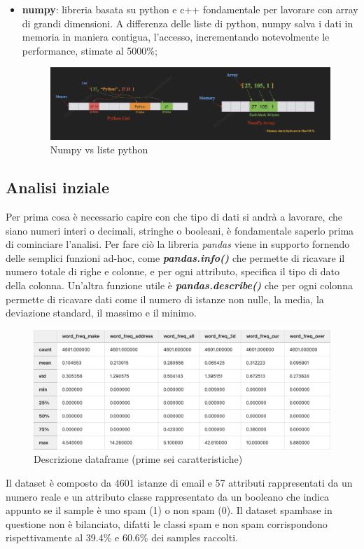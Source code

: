\documentclass[12pt,a4paper]{article}
\begin{document}
\begin{itemize}
    \item \textbf{numpy}: libreria basata su python e c++ fondamentale per lavorare con array di grandi dimensioni. A differenza delle liste di python, numpy salva i dati in memoria in maniera contigua, l'accesso, incrementando notevolmente le performance, stimate al 5000\%;
    \begin{figure}[h]
        \includegraphics[width=1\linewidth]{numpy_vs_list.png}
        \caption{Numpy vs liste python}
    \end{figure}

\end{itemize}

\clearpage
\subsection{Analisi inziale}
Per prima cosa è necessario capire con che tipo di dati si andrà a lavorare, che siano numeri interi o decimali, stringhe o booleani, è fondamentale saperlo prima di cominciare l'analisi.
Per fare ciò la libreria \textit{pandas} viene in supporto fornendo delle semplici funzioni ad-hoc, come\textbf{ \textit{pandas.info()}} che permette di ricavare il numero totale di righe e colonne, e per ogni attributo, specifica il tipo di dato della colonna.
Un'altra funzione utile è \textit{\textbf{pandas.describe()}} che per ogni colonna permette di ricavare dati come il numero di istanze non nulle, la media, la deviazione standard, il massimo e il minimo.

\begin{figure}[h]
    \includegraphics[width=1\columnwidth]{df_describe.png}
    \caption{Descrizione dataframe (prime sei caratteristiche)}
\end{figure}
Il dataset è composto da 4601 istanze di email e 57 attributi rappresentati da un numero reale e un attributo classe rappresentato da un booleano che indica appunto se il sample è uno spam (1) o non spam (0).
Il dataset spambase in questione non è bilanciato, difatti le classi spam e non spam corrispondono rispettivamente al 39.4\% e 60.6\% dei samples raccolti.
\end{document}

